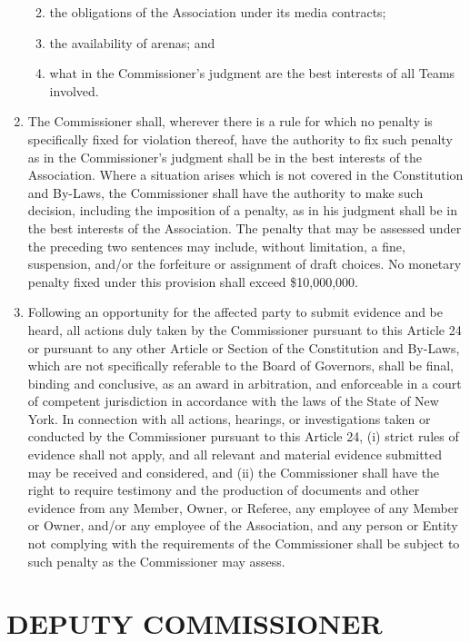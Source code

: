 \documentclass[]{book}
\providecommand{\tightlist}{%
  \setlength{\itemsep}{0pt}\setlength{\parskip}{0pt}}
\begin{document}
\begin{enumerate}
  \begin{enumerate}
  \def\labelenumii{(\roman{enumii})}
  \tightlist
  \item
    the obligations of the Association under its media contracts;
  \item
    the availability of arenas; and
  \item
    what in the Commissioner's judgment are the best interests of all Teams involved.
  \end{enumerate}
\item
  The Commissioner shall, wherever there is a rule for which no penalty is specifically fixed for violation thereof, have the authority to fix such penalty as in the Commissioner's judgment shall be in the best interests of the Association. Where a situation arises which is not covered in the Constitution and By-Laws, the Commissioner shall have the authority to make such decision, including the imposition of a penalty, as in his judgment shall be in the best interests of the Association. The penalty that may be assessed under the preceding two sentences may include, without limitation, a fine, suspension, and/or the forfeiture or assignment of draft choices. No monetary penalty fixed under this provision shall exceed \$10,000,000.
\item
  Following an opportunity for the affected party to submit evidence and be heard, all actions duly taken by the Commissioner pursuant to this Article 24 or pursuant to any other Article or Section of the Constitution and By-Laws, which are not specifically referable to the Board of Governors, shall be final, binding and conclusive, as an award in arbitration, and enforceable in a court of competent jurisdiction in accordance with the laws of the State of New York. In connection with all actions, hearings, or investigations taken or conducted by the Commissioner pursuant to this Article 24, (i) strict rules of evidence shall not apply, and all relevant and material evidence submitted may be received and considered, and (ii) the Commissioner shall have the right to require testimony and the production of documents and other evidence from any Member, Owner, or Referee, any employee of any Member or Owner, and/or any employee of the Association, and any person or Entity not complying with the requirements of the Commissioner shall be subject to such penalty as the Commissioner may assess.
\end{enumerate}

\hypertarget{deputy-commissioner}{%
\section{DEPUTY COMMISSIONER}\label{deputy-commissioner}}
\end{document}
